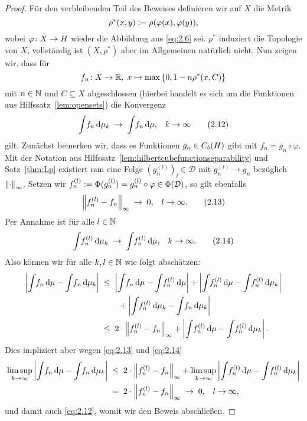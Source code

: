 \documentclass[../main/main.tex]{subfiles}
\begin{document}
\begin{proof}
		Für den verbleibenden Teil des Beweises definieren wir auf $X$ die Metrik
		\[ \rho^\ast(x, y) \vcentcolon = \rho(\varphi(x), \varphi(y)) \text{,} \]
		wobei $\varphi \colon X \to H$ wieder die Abbildung aus \eqref{eq:2.6} sei. 
		$\rho^\ast$ induziert die Topologie von $X$, vollständig ist $(X, \rho^\ast)$ 
		aber im Allgemeinen natürlich nicht. Nun zeigen wir, dass für 
		\[f_n \colon X \to \mathbb{R}, \; x \mapsto \max \left\{0, 1-n \rho^\ast(x, C)\right\} \] 
		mit $n \in \mathbb{N}$ und $C \subseteq X$ abgeschlossen (hierbei handelt es sich 
		um die Funktionen aus Hilfssatz~\ref{lem:opensets}) die Konvergenz
		\[ \int_{} \, f_n \, \mathrm{d}\mu_k \; \to \; \int_{} \, f_n \, \mathrm{d}\mu \text{,} 
			\quad k \to \infty \label{eq:2.12} \tag{2.12}\]
		gilt. Zunächst bemerken wir, dass es Funktionen $g_n \in C_b(H)$ 
		gibt mit $f_n = g_n \circ \varphi$. Mit der Notation aus 
		Hilfssatz~\ref{lem:hilbertcubefunctionseparability} und Satz~\ref{thm:Lp} 
		existiert nun eine Folge $(g_n^{(l)})_l \in \mathcal{D}$ mit $g_n^{(l)} \to g_n$ 
		bezüglich $\left\lVert\cdot\right\rVert_\infty$. Setzen wir 
		$f_n^{(l)} \vcentcolon = \Phi(g_n^{(l)}) = g_n^{(l)} \circ \varphi \in \Phi(\mathcal{D})$, 
		so gilt ebenfalls
		\[ \left\lVert f_n^{(l)} - f_n\right\rVert_\infty \; \to \; 0 \text{,} 
			\quad l \to \infty \text{.} \label{eq:2.13} \tag{2.13} \]
		Per Annahme ist für alle $l \in \mathbb{N}$
		\[ \int_{} \, f_n^{(l)} \, \mathrm{d}\mu_k \; \to \; \int_{} \, f_n^{(l)} \, \mathrm{d}\mu \text{,} 
			\quad k \to \infty \text{.} \label{eq:2.14} \tag{2.14} \]
		Also können wir für alle $k, l \in \mathbb{N}$ wie folgt abschätzen:
		\begin{align*}
			\left| \int_{} \, f_n \, \mathrm{d}\mu - \int_{} \, f_n \, \mathrm{d}\mu_k \right| \; &\leq \; 
			\left| \int_{} \, f_n \, \mathrm{d}\mu - \int_{} \, f_n^{(l)} \, \mathrm{d}\mu \right| + 
			\left| \int_{} \, f_n^{(l)} \, \mathrm{d}\mu - \int_{} \, f_n^{(l)} \, \mathrm{d}\mu_k \right| \\
			& \qquad + 
			\left| \int_{} \, f_n^{(l)} \, \mathrm{d}\mu_k - \int_{} \, f_n \, \mathrm{d}\mu_k \right| \\
			&\leq \; 2 \cdot \left\lVert f_n^{(l)} - f_n\right\rVert_\infty + \left| \int_{} \, f_n^{(l)} \, \mathrm{d}\mu - 
			\int_{} \, f_n^{(l)} \, \mathrm{d}\mu_k \right| \text{.}
		\end{align*}
		Dies impliziert aber wegen \eqref{eq:2.13} und \eqref{eq:2.14}
		\begin{align*}
			\limsup_{k \to \infty} \left| \int_{} \, f_n \, \mathrm{d}\mu - 
			\int_{} \, f_n \, \mathrm{d}\mu_k \right|
			\; &\leq \; 2 \cdot \left\lVert f_n^{(l)} - f_n\right\rVert_\infty + 
			\limsup_{k \to \infty} \left| \int_{} \, f_n^{(l)} \, \mathrm{d}\mu - 
			\int_{} \, f_n^{(l)} \, \mathrm{d}\mu_k \right| \\
			&= \; 2 \cdot \left\lVert f_n^{(l)} - f_n\right\rVert_\infty \; \to \; 0 \text{,} 
			\quad l \to \infty \text{,}
		\end{align*}
		und damit auch \eqref{eq:2.12}, womit wir den Beweis abschließen.
	\end{proof}
\end{document}
